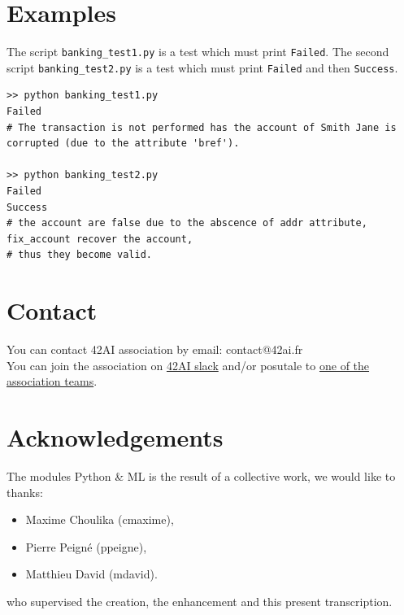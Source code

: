 \documentclass{42-en}
\begin{document}

\section*{Examples}
The script \texttt{banking\_test1.py} is a test which must print \texttt{Failed}.
The second script \texttt{banking\_test2.py} is a test which must print \texttt{Failed} and then \texttt{Success}.

\begin{verbatim}
>> python banking_test1.py
Failed
# The transaction is not performed has the account of Smith Jane is corrupted (due to the attribute 'bref').

>> python banking_test2.py
Failed
Success
# the account are false due to the abscence of addr attribute, fix_account recover the account,
# thus they become valid.
\end{verbatim}



\newpage

\section*{Contact}
You can contact 42AI association by email: contact@42ai.fr\\
You can join the association on \href{https://join.slack.com/t/42-ai/shared_invite/zt-ebccw5r7-YPkDM6xOiYRPjqJXkrKgcA}{42AI slack}
and/or posutale to \href{https://forms.gle/VAFuREWaLmaqZw2D8}{one of the association teams}.

\section*{Acknowledgements}
The modules Python \& ML is the result of a collective work, we would like to thanks:
\begin{itemize}
  \item Maxime Choulika (cmaxime),
  \item Pierre Peigné (ppeigne),
  \item Matthieu David (mdavid).
\end{itemize}
who supervised the creation, the enhancement and this present transcription.
\end{document}
